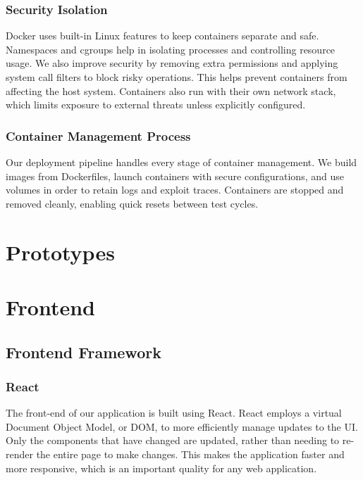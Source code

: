 \documentclass[12pt]{article}
\begin{document}
\subsubsection{Security Isolation}
Docker uses built-in Linux features to keep containers separate and safe. Namespaces and cgroups help in isolating processes and controlling resource usage. We also improve security by removing extra permissions and applying system call filters to block risky operations. This helps prevent containers from affecting the host system. Containers also run with their own network stack, which limits exposure to external threats unless explicitly configured.

\subsubsection{Container Management Process}
Our deployment pipeline handles every stage of container management. We build images from Dockerfiles, launch containers with secure configurations, and use volumes in order to retain logs and exploit traces. Containers are stopped and removed cleanly, enabling quick resets between test cycles.

\section{Prototypes}


\section{Frontend}
\subsection{Frontend Framework}
\subsubsection{React}
The front-end of our application is built using React. React employs a virtual Document Object Model, or DOM, to more efficiently manage updates to the UI. Only the components that have changed are updated, rather than needing to re-render the entire page to make changes. This makes the application faster and more responsive, which is an important quality for any web application.
\end{document}

